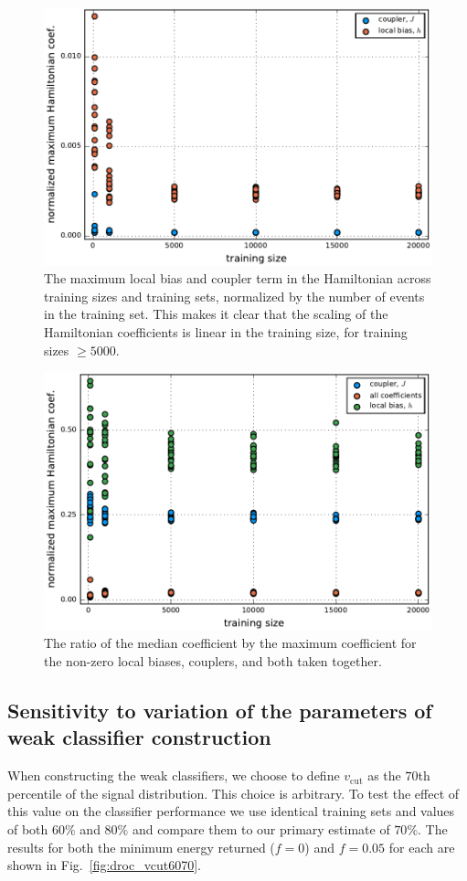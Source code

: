  \begin{figure}[hbb]
 \centering
  \includegraphics[width=0.7\columnwidth]{chapters/Higgs/precision_by_training_size_and_fold}
  \caption{The maximum local bias and coupler term in the Hamiltonian across training sizes and training sets, normalized by the number of events in the training set. This makes it clear that the scaling of the Hamiltonian coefficients is linear in the training size, for training sizes $\geq 5000$.}
  \label{fig:precision}
\end{figure}

 \begin{figure}[hbb]
 \centering
  \includegraphics[width=0.7\columnwidth]{chapters/Higgs/precision_by_training_size_and_fold_med_to_max}
  \caption{The ratio of the median coefficient by the maximum coefficient for the non-zero local biases, couplers, and both taken together.
}
  \label{fig:precision2}
\end{figure}


\subsection{Sensitivity to variation of the parameters of weak classifier construction}
When constructing the weak classifiers, we choose to define $v_{\text{cut}}$ as the $70$th percentile of the signal distribution. This choice is arbitrary. To test the  effect of this value  on the classifier performance we use  identical training sets and values of both $60\%$ and $80\%$ and compare  them to our primary estimate of $70\%$. The results for both the minimum energy returned ($f=0$) and $f=0.05$ for each are shown in Fig.~\ref{fig:droc_vcut6070}.

